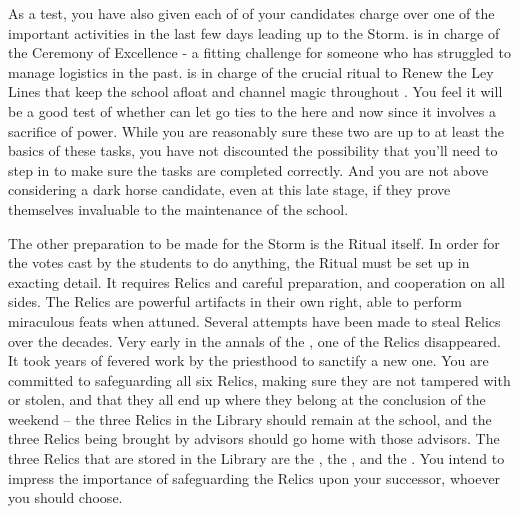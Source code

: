 \documentclass[char]{GL2020}
\begin{document}
As a test, you have also given each of of your candidates charge over one of the important activities in the last few days leading up to the Storm. \cMusic{} is in charge of the Ceremony of Excellence - a fitting challenge for someone who has struggled to manage logistics in the past. \cBeetle{} is in charge of the crucial ritual to Renew the Ley Lines that keep the school afloat and channel magic throughout \pEarth{}. You feel it will be a good test of whether \cBeetle{\they} can let go \cBeetle{\their} ties to the here and now since it involves a sacrifice of power. While you are reasonably sure these two are up to at least the basics of these tasks, you have not discounted the possibility that you'll need to step in to make sure the tasks are completed correctly. And you are not above considering a dark horse candidate, even at this late stage, if they prove themselves invaluable to the maintenance of the school.

The other preparation to be made for the Storm is the Ritual itself. In order for the votes cast by the students to do anything, the Ritual must be set up in exacting detail. It requires Relics and careful preparation, and cooperation on all sides. The Relics are powerful artifacts in their own right, able to perform miraculous feats when attuned. Several attempts have been made to steal Relics over the decades. Very early in the annals of the \pSc{}, one of the \pFarm{} Relics disappeared. It took years of fevered work by the priesthood to sanctify a new one. You are committed to safeguarding all six Relics, making sure they are not tampered with or stolen, and that they all end up where they belong at the conclusion of the weekend – the three Relics in the Library should remain at the school, and the three Relics being brought by advisors should go home with those advisors. The three  Relics that are stored in the Library are the \iNet{}, the \iLariat{}, and the \iScythe{}. You intend to impress the importance of safeguarding the Relics upon your successor, whoever you should choose.
\end{document}
